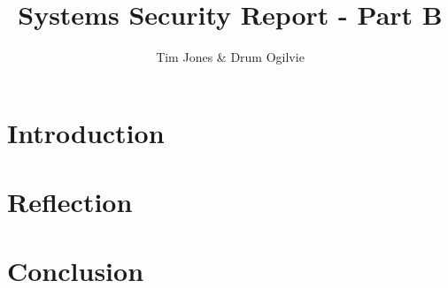 \documentclass[notitlepage]{article}
\title{Systems Security Report - Part B}
\author{Tim Jones \& Drum Ogilvie}
\begin{document}
\maketitle

\section{Introduction}






\section{Reflection}



\section{Conclusion}


\clearpage
{}

\end{document}
